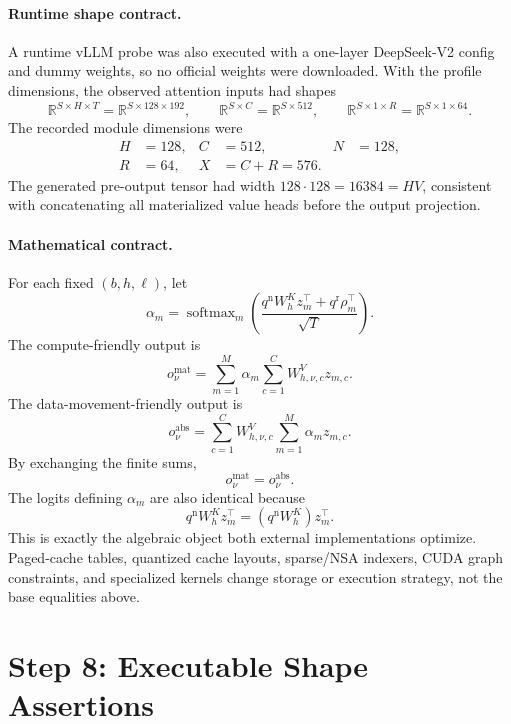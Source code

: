 \documentclass[11pt]{article}
\newcommand{\R}{\mathbb{R}}
\newcommand{\softmax}{\operatorname{softmax}}
\begin{document}
\paragraph{Runtime shape contract.}
A runtime vLLM probe was also executed with a one-layer DeepSeek-V2 config and
dummy weights, so no official weights were downloaded.  With the profile
dimensions, the observed attention inputs had shapes
\[
  \R^{S\times H\times T}
  =
  \R^{S\times128\times192},
  \qquad
  \R^{S\times C}
  =
  \R^{S\times512},
  \qquad
  \R^{S\times1\times R}
  =
  \R^{S\times1\times64}.
\]
The recorded module dimensions were
\[
\begin{aligned}
  H&=128,&
  C&=512,&
  N&=128,\\
  R&=64,&
  X&=C+R=576.&
\end{aligned}
\]
The generated pre-output tensor had width $128\cdot128=16384=HV$, consistent
with concatenating all materialized value heads before the output projection.

\paragraph{Mathematical contract.}
For each fixed $(b,h,\ell)$, let
\[
  \alpha_m
  =
  \softmax_m\!\left(
    \frac{
      q^{\mathrm n}W^K_h z_m^\top
      +
      q^{\mathrm r}\rho_m^\top
    }{\sqrt{T}}
  \right).
\]
The compute-friendly output is
\[
  o^{\mathrm{mat}}_\nu
  =
  \sum_{m=1}^M \alpha_m
  \sum_{c=1}^C W^V_{h,\nu,c}z_{m,c}.
\]
The data-movement-friendly output is
\[
  o^{\mathrm{abs}}_\nu
  =
  \sum_{c=1}^C W^V_{h,\nu,c}
  \sum_{m=1}^M \alpha_m z_{m,c}.
\]
By exchanging the finite sums,
\[
  o^{\mathrm{mat}}_\nu=o^{\mathrm{abs}}_\nu.
\]
The logits defining $\alpha_m$ are also identical because
\[
  q^{\mathrm n}W^K_h z_m^\top
  =
  (q^{\mathrm n}W^K_h)z_m^\top.
\]
This is exactly the algebraic object both external implementations optimize.
Paged-cache tables, quantized cache layouts, sparse/NSA indexers, CUDA graph
constraints, and specialized kernels change storage or execution strategy, not
the base equalities above.

\section{Step 8: Executable Shape Assertions}
\end{document}
